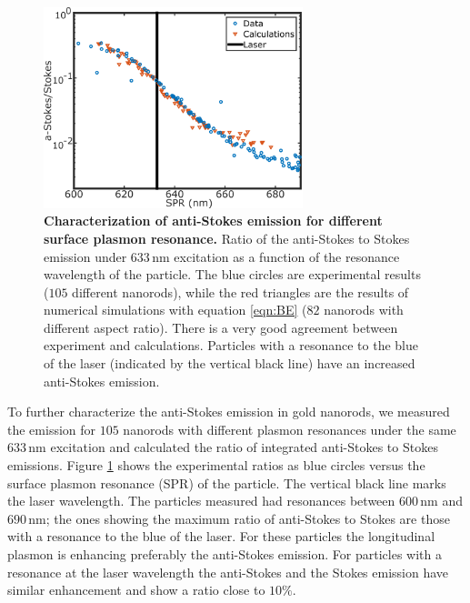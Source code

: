 \documentclass[journal=nalefd,manuscript=letter]{achemso}
\newcommand{\HI}[1]{{#1}} %
\newcommand{\nm}{\ensuremath{\,\textrm{nm}}}
\begin{document}
\begin{figure}[tp] \centering
\includegraphics[width=75.5mm]{Figures/02_AS_vs_S_SPR/02_AS_vs_S_SPR.png}
\caption{\textbf{Characterization of anti-Stokes emission for different surface plasmon resonance.} 
Ratio of the anti-Stokes to Stokes emission under $633\nm$ excitation
as a function of the resonance wavelength of the particle.
The blue circles are experimental results (\HI{$105$ different nanorods}), while the red triangles are the
results of numerical simulations with equation \ref{eqn:BE} (\HI{$82$ nanorods with different aspect ratio}). 
There is a very good agreement between experiment and calculations. Particles with a resonance
to the blue of the laser (indicated by the vertical black line) have an increased anti-Stokes
emission.}
	\label{fig:ASS-ratio}
\end{figure}

To further characterize the anti-Stokes emission in gold nanorods, we measured the emission for \HI{$105$}
nanorods with different plasmon resonances under the same $633\nm$ excitation
and calculated the ratio of integrated anti-Stokes to Stokes emissions.
Figure \ref{fig:ASS-ratio} shows the experimental ratios as blue circles
versus the surface plasmon resonance (SPR) of the
particle. The vertical black line marks the laser wavelength. The particles measured 
had resonances between $600\nm$ and $690\nm$; the ones showing the
maximum ratio of anti-Stokes to Stokes are those with a resonance to the blue of
the laser. For these particles the longitudinal plasmon is enhancing preferably the
anti-Stokes emission. For particles with a resonance at the laser wavelength the
anti-Stokes and the Stokes emission have similar enhancement and show a ratio
close to $10\%$.
\end{document}
